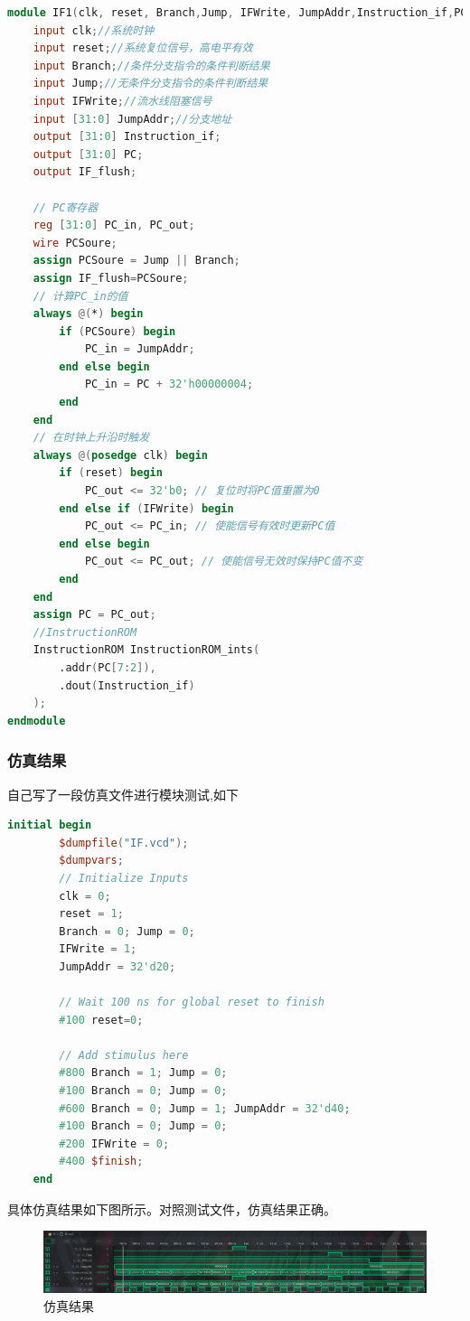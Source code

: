 \documentclass[12pt,hyperref,a4paper,UTF8]{ctexart}
\begin{document}
\begin{lstlisting}[language=Verilog,caption=BranchTest仿真文件]
module IF1(clk, reset, Branch,Jump, IFWrite, JumpAddr,Instruction_if,PC,IF_flush);
    input clk;//系统时钟
    input reset;//系统复位信号，高电平有效
    input Branch;//条件分支指令的条件判断结果
    input Jump;//无条件分支指令的条件判断结果
    input IFWrite;//流水线阻塞信号
    input [31:0] JumpAddr;//分支地址
    output [31:0] Instruction_if;
    output [31:0] PC;
    output IF_flush;

    // PC寄存器
    reg [31:0] PC_in, PC_out;
    wire PCSoure;
    assign PCSoure = Jump || Branch;
    assign IF_flush=PCSoure;
    // 计算PC_in的值
    always @(*) begin
        if (PCSoure) begin
            PC_in = JumpAddr;
        end else begin
            PC_in = PC + 32'h00000004;
        end
    end
    // 在时钟上升沿时触发
    always @(posedge clk) begin
        if (reset) begin
            PC_out <= 32'b0; // 复位时将PC值重置为0
        end else if (IFWrite) begin
            PC_out <= PC_in; // 使能信号有效时更新PC值
        end else begin
            PC_out <= PC_out; // 使能信号无效时保持PC值不变
        end
    end
    assign PC = PC_out;
    //InstructionROM
    InstructionROM InstructionROM_ints(
        .addr(PC[7:2]),
        .dout(Instruction_if)
    );
endmodule
\end{lstlisting}



\newpage


\subsubsection*{\Large 仿真结果}
\normalsize
自己写了一段仿真文件进行模块测试,如下
\begin{lstlisting}[language=Verilog,caption=IF模块仿真文件]
	initial begin
		$dumpfile("IF.vcd");
 		$dumpvars;
		// Initialize Inputs
		clk = 0;
		reset = 1;
		Branch = 0; Jump = 0;
		IFWrite = 1;
		JumpAddr = 32'd20;
		
		// Wait 100 ns for global reset to finish
		#100 reset=0;

		// Add stimulus here
		#800 Branch = 1; Jump = 0;
		#100 Branch = 0; Jump = 0;
		#600 Branch = 0; Jump = 1; JumpAddr = 32'd40;
		#100 Branch = 0; Jump = 0;
		#200 IFWrite = 0;
		#400 $finish;	
	end
\end{lstlisting}


    具体仿真结果如下图所示。对照测试文件，仿真结果正确。
    \begin{figure}[H]
        \centering
        \includegraphics[width=1\textwidth]{figures/fig/sim6.png}
        \caption{仿真结果}
    \end{figure}
\end{document}

